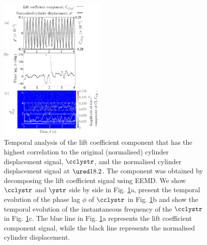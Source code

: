 \documentclass[a4paper,fleqn]{cas-sc}
\begin{document}
\begin{figure}
  \centering
  \includegraphics[width=0.47\textwidth]{figs/figure17}
  \caption{Temporal analysis of the lift coefficient component that has the highest correlation to the original (normalised) cylinder displacement signal, $\cclystr$, and the normalised cylinder displacement signal at $\ured 18.2$. The component was obtained by decomposing the lift coefficient signal using EEMD. We show $\cclystr$ and $\ystr$ side by side in Fig. \ref{fig:tempAnalysisStableInitialBranch}a, present the temporal evolution of the phase lag $\phi$ of $\cclystr$ in Fig. \ref{fig:tempAnalysisStableInitialBranch}b and show the temporal evolution of the instantaneous frequency of the $\cclystr$ in Fig. \ref{fig:tempAnalysisStableInitialBranch}c. The blue line in Fig. \ref{fig:tempAnalysisStableInitialBranch}a represents the lift coefficient component signal, while the black line represents the normalised cylinder displacement.}
  \label{fig:tempAnalysisStableInitialBranch}
\end{figure}
\end{document}

